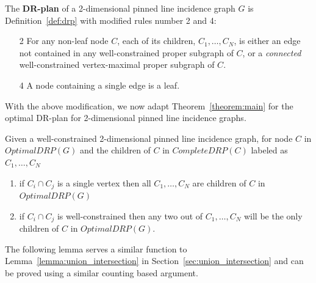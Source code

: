 \begin{definition}

 The \textbf{DR-plan} of  a 2-dimensional pinned line incidence graph $G$ is Definition~\ref{def:drp} with  modified rules number 2 and 4:
    \begin{enumerate}
        \item[2] For any non-leaf node $C$, each of its children, $C_1,\ldots,C_N$, is either an edge not contained in any well-constrained proper subgraph of $C$, or a {\em connected} well-constrained vertex-maximal proper subgraph of  $C$.
        \item[4] A node containing a single edge is a leaf.
    \end{enumerate}
\end{definition}


With the above modification,
we now adapt Theorem~\ref{theorem:main} %
for the optimal DR-plan for 2-dimensional pinned line incidence graphs.


\begin{corollary}
Given a well-constrained 2-dimensional pinned line incidence graph, for node $C$ in $OptimalDRP(G)$ and the children of $C$ in $CompleteDRP(C)$ labeled as $C_1,\ldots,C_N$
\begin{enumerate}
    \item if $C_i \cap C_j$ is a single vertex then all $C_1,\ldots,C_N$ are children of $C$ in $OptimalDRP(G)$
    \item if $C_i \cap C_j$ is well-constrained then any two out of $C_1,\ldots,C_N$ will be the only children of $C$ in $OptimalDRP(G)$.
\end{enumerate}
\label{cor:pinned}
\end{corollary}

The following lemma serves a similar function to Lemma~\ref{lemma:union_intersection} in Section~\ref{sec:union_intersection}
and can be proved using a similar counting based argument.


